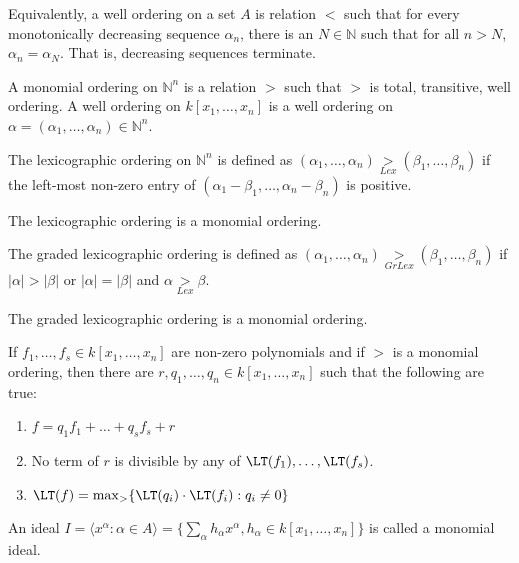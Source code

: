 \documentclass[crop=false,class=article,oneside]{standalone}
\begin{document}
    \begin{remark}
    Equivalently, a well ordering on a set $A$ is relation $<$ such that for every monotonically decreasing sequence $\alpha_n$, there is an $N\in \mathbb{N}$ such that for all $n>N$, $\alpha_n = \alpha_N$. That is, decreasing sequences terminate.
    \end{remark}
    \begin{definition}
    A monomial ordering on $\mathbb{N}^n$ is a relation $>$ such that $>$ is total, transitive, well ordering. A well ordering on $k[x_1,\hdots ,x_n]$ is a well ordering on $\alpha = (\alpha_1,\hdots, \alpha_n) \in \mathbb{N}^n$.
    \end{definition}
    \begin{definition}
    The lexicographic ordering on $\mathbb{N}^n$ is defined as $(\alpha_1,\hdots, \alpha_n) \underset{Lex}{>} (\beta_1,\hdots, \beta_n)$ if the left-most non-zero entry of $(\alpha_1-\beta_1,\hdots, \alpha_n-\beta_n)$ is positive.
    \end{definition}
    \begin{theorem}
    The lexicographic ordering is a monomial ordering.
    \end{theorem}
    \begin{definition}
    The graded lexicographic ordering is defined as $(\alpha_1,\hdots, \alpha_n) \underset{GrLex}{>}(\beta_1,\hdots, \beta_n)$ if $|\alpha|>|\beta|$ or $|\alpha| = |\beta|$ and $\alpha \underset{Lex}{>}\beta$.
    \end{definition}
    \begin{theorem}
    The graded lexicographic ordering is a monomial ordering.
    \end{theorem}
    \begin{theorem}
    If $f_1,\hdots, f_s\in k[x_1,\hdots ,x_n]$ are non-zero polynomials and if $>$ is a monomial ordering, then there are $r,q_1,\hdots, q_n\in k[x_1,\hdots ,x_n]$ such that the following are true:
    \begin{enumerate}
    \item $f=q_1f_1+\hdots + q_sf_s + r$
    \item No term of $r$ is divisible by any of $\LT(f_1),\hdots, \LT(f_s)$.
    \item $\LT(f) = \max_{>}\{\LT(q_i)\cdot \LT(f_i):q_i \ne 0\}$
    \end{enumerate}
    \end{theorem}
    \begin{definition}
    An ideal $I = \langle x^{\alpha}: \alpha \in A\rangle = \{\sum_{\alpha} h_{\alpha} x^\alpha, h_{\alpha} \in k[x_1,\hdots ,x_n]\}$ is called a monomial ideal.
    \end{definition}
\end{document}
